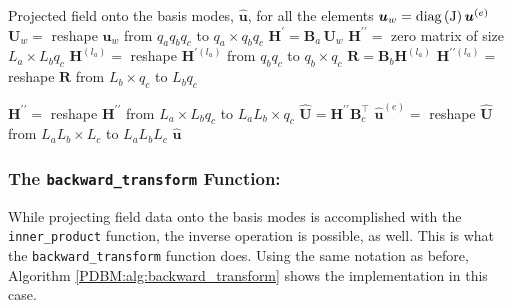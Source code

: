 \documentclass{ccr16}
\begin{document}
{{{\begin{algorithm}[t]
\begin{algorithmic}[1]
                        \Ensure Projected field onto the basis modes, $\hat{\boldsymbol{u}}$, for all the elements
                                \State $\boldsymbol{u}_{w} = \textup{diag} \left ( \mathrm{J} \right ) \boldsymbol{u}^{\left ( e \right )}$
                                \State $\boldsymbol{U}_{w} = $ reshape $\boldsymbol{u}_{w}$ from $q_{a} q_{b} q_{c}$ to $q_{a} \times q_{b} q_{c}$
                                \State $\boldsymbol{H}^{\prime} = \boldsymbol{B}_{a} \, \boldsymbol{U}_{w}$
                                \State $\boldsymbol{H}^{\prime \prime} = $ zero matrix of size $L_{a} \times L_{b} q_{c}$
                                    \State $\boldsymbol{H}^{\left ( l_{a} \right )} = $ reshape $\boldsymbol{H}^{\prime \left ( l_{a} \right )}$ from $q_{b} q_{c}$ to $q_{b} \times q_{c}$
                                    \State $\boldsymbol{R} = \boldsymbol{B}_{b} \boldsymbol{H}^{\left ( l_{a} \right )}$
                                    \State $\boldsymbol{H}^{\prime \prime \left ( l_{a} \right )} = $ reshape $\boldsymbol{R}$ from $L_{b} \times q_{c}$ to $L_{b} q_{c}$
                                \EndFor

                                \State $\boldsymbol{H}^{\prime \prime} = $ reshape $\boldsymbol{H}^{\prime \prime}$ from $L_{a} \times L_{b} q_{c}$ to $L_{a} L_{b} \times q_{c}$
                                \State $\hat{\boldsymbol{U}} = \boldsymbol{H}^{\prime \prime} \boldsymbol{B}_{c}^{\top}$
                                \State $\hat{\boldsymbol{u}}^{\left ( e \right )} = $ reshape $\hat{\boldsymbol{U}}$ from $L_{a} L_{b} \times L_{c}$ to $L_{a} L_{b} L_{c}$
                            \EndFor
                            \State \Return $\hat{\boldsymbol{u}}$
                        \EndProcedure
                    \end{algorithmic}
                    \label{PDBM:alg:inner_product}
                \end{algorithm}
            }

            \subsubsection{The \texttt{backward\_transform} Function:}
            {
                While projecting field data onto the basis modes is accomplished with the \texttt{inner\_product} function, the inverse operation is possible, as well. This is what the \texttt{backward\_transform} function does. Using the same notation as before, Algorithm \ref{PDBM:alg:backward_transform} shows the implementation in this case.

}}}
\end{document}
